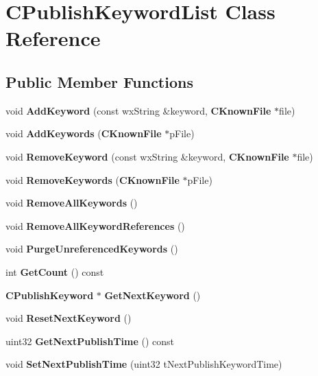 \section{CPublishKeywordList Class Reference}
\label{classCPublishKeywordList}
\subsection*{Public Member Functions}
\begin{DoxyCompactItemize}
\item 
void {\bfseries AddKeyword} (const wxString \&keyword, {\bf CKnownFile} $\ast$file)\label{classCPublishKeywordList_ad4a286a483d8b13e8e2636b62946b25e}

\item 
void {\bfseries AddKeywords} ({\bf CKnownFile} $\ast$pFile)\label{classCPublishKeywordList_a72ddc2c541f233ea1a1cefb4e3c3d78b}

\item 
void {\bfseries RemoveKeyword} (const wxString \&keyword, {\bf CKnownFile} $\ast$file)\label{classCPublishKeywordList_ae66295aef9b7483d0d4048c22d3bcdac}

\item 
void {\bfseries RemoveKeywords} ({\bf CKnownFile} $\ast$pFile)\label{classCPublishKeywordList_a5ec9f7fb42bddbcd3f6a2d666bbd5b2f}

\item 
void {\bfseries RemoveAllKeywords} ()\label{classCPublishKeywordList_a862cd7ea8315ddeb83298eafd51524b6}

\item 
void {\bfseries RemoveAllKeywordReferences} ()\label{classCPublishKeywordList_a5bf74800df0cece8d4fc5929517522d3}

\item 
void {\bfseries PurgeUnreferencedKeywords} ()\label{classCPublishKeywordList_ab21c9cb6cd1890ad68df69673da67d0c}

\item 
int {\bfseries GetCount} () const \label{classCPublishKeywordList_a340311ddf49ae1bb1b3fcdd74612dc03}

\item 
{\bf CPublishKeyword} $\ast$ {\bfseries GetNextKeyword} ()\label{classCPublishKeywordList_a9a7ecaf1bce4721e8119b5476e708579}

\item 
void {\bfseries ResetNextKeyword} ()\label{classCPublishKeywordList_a4cc9236a76cb115fd2cf7ff98fb05e4a}

\item 
uint32 {\bfseries GetNextPublishTime} () const \label{classCPublishKeywordList_a851abd02846a48218071b41e7b226d6b}

\item 
void {\bfseries SetNextPublishTime} (uint32 tNextPublishKeywordTime)\label{classCPublishKeywordList_a6ed29f2abab5a737a8ae2d75d19e17c4}

\end{DoxyCompactItemize}
